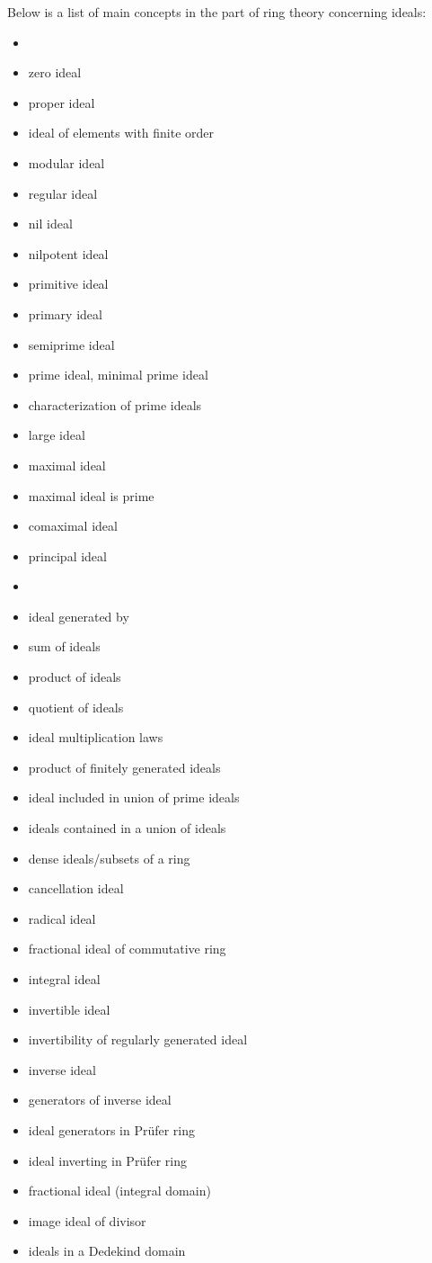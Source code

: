 \documentclass[12pt]{article}
\theoremstyle{definition}
\begin{document}
Below is a list of main concepts in the part of ring theory concerning ideals:

\begin{itemize}
\item {}
\item zero ideal
\item proper ideal
\item ideal of elements with finite order
\item modular ideal
\item regular ideal
\item nil ideal
\item nilpotent ideal
\item primitive ideal
\item primary ideal
\item semiprime ideal
\item prime ideal, minimal prime ideal
\item characterization of prime ideals
\item large ideal
\item maximal ideal
\item maximal ideal is prime
\item comaximal ideal
\item principal ideal
\item {}
\item ideal generated by
\item sum of ideals
\item product of ideals
\item quotient of ideals
\item ideal multiplication laws
\item product of finitely generated ideals
\item ideal included in union of prime ideals
\item ideals contained in a union of ideals
\item dense ideals/subsets of a ring
\item cancellation ideal
\item radical ideal
\item fractional ideal of commutative ring
\item integral ideal
\item invertible ideal
\item invertibility of regularly generated ideal
\item inverse ideal
\item generators of inverse ideal
\item ideal generators in Pr\"ufer ring
\item ideal inverting in Pr\"ufer ring
\item fractional ideal (integral domain)
\item image ideal of divisor
\item ideals in a Dedekind domain

\end{itemize}
\end{document}
